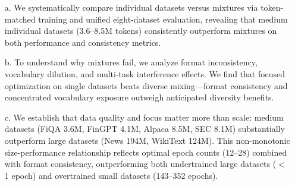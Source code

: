\documentclass[11pt,a4paper,english,oneside]{book}
\begin{document}
\begin{itemize}
    \item[a.] We systematically compare individual datasets versus mixtures via token-matched training and unified eight-dataset evaluation, revealing that medium individual datasets (3.6–8.5M tokens) consistently outperform mixtures on both performance and consistency metrics.

    \item[b.] To understand why mixtures fail, we analyze format inconsistency, vocabulary dilution, and multi-task interference effects. We find that focused optimization on single datasets beats diverse mixing—format consistency and concentrated vocabulary exposure outweigh anticipated diversity benefits.

    \item[c.] We establish that data quality and focus matter more than scale: medium datasets (FiQA 3.6M, FinGPT 4.1M, Alpaca 8.5M, SEC 8.1M) substantially outperform large datasets (News 194M, WikiText 124M). This non-monotonic size-performance relationship reflects optimal epoch counts (12–28) combined with format consistency, outperforming both undertrained large datasets ($<$1 epoch) and overtrained small datasets (143–352 epochs).
\end{itemize}

\newpage

\tableofcontents
\listoffigures
\listoftables

\newpage
{}









\printbibliography

\newpage

\thispagestyle{firststyle}
\end{document}

